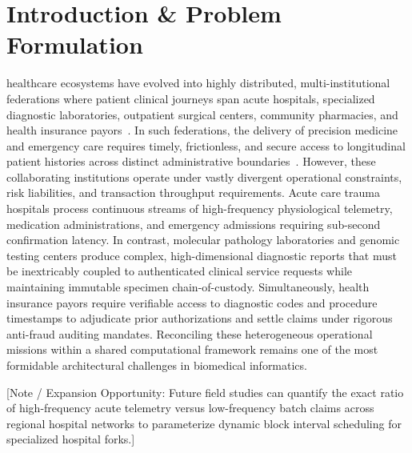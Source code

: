 \section{Introduction \& Problem Formulation}
\label{sec:introduction}

 healthcare ecosystems have evolved into highly distributed, multi-institutional federations where patient clinical journeys span acute hospitals, specialized diagnostic laboratories, outpatient surgical centers, community pharmacies, and health insurance payors~\cite{kuo2017blockchain, gordon2018blockchain}. In such federations, the delivery of precision medicine and emergency care requires timely, frictionless, and secure access to longitudinal patient histories across distinct administrative boundaries~\cite{mandl2016push, vogel2021interoperability}. However, these collaborating institutions operate under vastly divergent operational constraints, risk liabilities, and transaction throughput requirements. Acute care trauma hospitals process continuous streams of high-frequency physiological telemetry, medication administrations, and emergency admissions requiring sub-second confirmation latency. In contrast, molecular pathology laboratories and genomic testing centers produce complex, high-dimensional diagnostic reports that must be inextricably coupled to authenticated clinical service requests while maintaining immutable specimen chain-of-custody. Simultaneously, health insurance payors require verifiable access to diagnostic codes and procedure timestamps to adjudicate prior authorizations and settle claims under rigorous anti-fraud auditing mandates. Reconciling these heterogeneous operational missions within a shared computational framework remains one of the most formidable architectural challenges in biomedical informatics.

[Note / Expansion Opportunity: Future field studies can quantify the exact ratio of high-frequency acute telemetry versus low-frequency batch claims across regional hospital networks to parameterize dynamic block interval scheduling for specialized hospital forks.]

